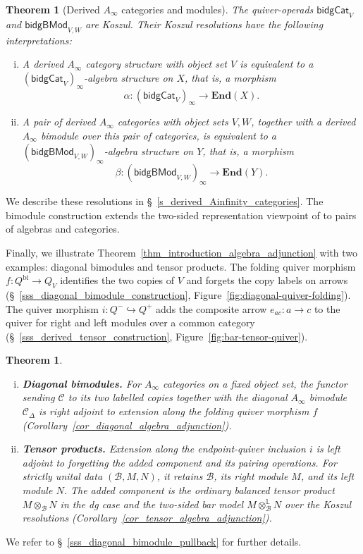 \documentclass[11pt,letterpaper]{article}
\numberwithin{equation}{section}
\theoremstyle{plain}
\newcounter{mainthm}
\newtheorem{main}[mainthm]{Theorem}
\theoremstyle{definition}
\theoremstyle{remark}
\begin{document}
\begin{main}[Derived $A_\infty$ categories and modules]
The quiver-operads $\mathsf{bidgCat}_V$ and $\mathsf{bidgBMod}_{V,W}$ are Koszul. Their Koszul resolutions have the following interpretations:
\begin{enumerate}[(i)]
\itemsep 1pt
\item A derived $A_\infty$ category structure with object set $V$ is equivalent to a $(\mathsf{bidgCat}_V)_\infty$-algebra structure on $X$, that is, a morphism
\[
\alpha:(\mathsf{bidgCat}_V)_\infty
\longrightarrow \mathbf{End}(X).
\]
\item A pair of derived $A_\infty$ categories with object sets $V,W$, together with a derived $A_\infty$ bimodule over this pair of categories, is equivalent to a $(\mathsf{bidgBMod}_{V,W})_\infty$-algebra structure on $Y$, that is, a morphism
\[
\beta:(\mathsf{bidgBMod}_{V,W})_\infty
\longrightarrow \mathbf{End}(Y).
\]
\end{enumerate}
\end{main}
We describe these resolutions in \S~\ref{s_derived_Ainfinity_categories}. The bimodule construction extends the two-sided representation viewpoint of \cite{Aponte_Livernet_Robertson_Whitehouse_Ziegenhagen_representations} to pairs of algebras and categories.


Finally, we illustrate Theorem~\ref{thm_introduction_algebra_adjunction}
with two examples: diagonal bimodules and tensor products.
The folding quiver morphism $f:Q^{\mathrm{bi}}\to Q_V$ identifies
the two copies of $V$ and forgets the copy labels on arrows
(\S~\ref{sss_diagonal_bimodule_construction},
Figure~\ref{fig:diagonal-quiver-folding}).
The quiver morphism $i:Q^-\hookrightarrow Q^+$ adds the composite
arrow $e_{ac}:a\to c$ to the quiver for right and left modules
over a common category
(\S~\ref{sss_derived_tensor_construction},
Figure~\ref{fig:bar-tensor-quiver}).

\begin{main}
\leavevmode
\begin{enumerate}[(i),itemsep=6pt]
\item \textup{\textbf{Diagonal bimodules.}}
For $A_\infty$ categories on a fixed object set, the functor
sending $\mathcal C$ to its two labelled copies together with
the diagonal $A_\infty$ bimodule $\mathcal C_\Delta$ is right adjoint to
extension along the folding quiver morphism $f$
(Corollary~\ref{cor_diagonal_algebra_adjunction}).

\item \textup{\textbf{Tensor products.}}
Extension along the endpoint-quiver inclusion $i$ is left adjoint
to forgetting the added component and its pairing operations.
For strictly unital data $(\mathcal B,M,N)$, it retains
$\mathcal B$, its right module $M$, and its left module $N$.
The added component is the ordinary balanced tensor product
$M\otimes_{\mathcal B}N$ in the dg case and the two-sided bar
model $M\otimes_{\mathcal B}^{\mathbb L}N$ over the Koszul
resolutions
(Corollary~\ref{cor_tensor_algebra_adjunction}).
\end{enumerate}
\end{main}
We refer to \S~\ref{sss_diagonal_bimodule_pullback} for further details.
\end{document}
